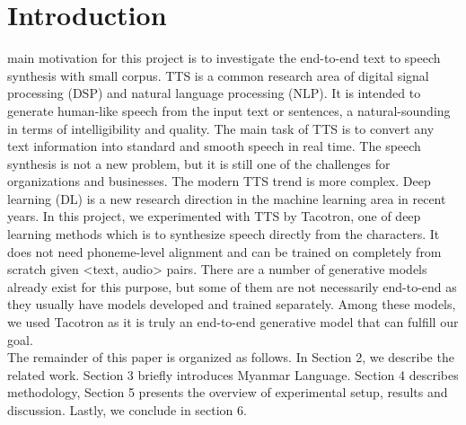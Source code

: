 \documentclass[journal,transmag]{JIISTjrnl}
\begin{document}
\maketitle





%



\section{Introduction}
% 
% 
% 
% 
 main motivation for this project is to investigate the end-to-end text to speech synthesis with small corpus. TTS is a common research area of digital signal processing (DSP) and natural language processing (NLP). It is intended to generate human-like speech from the input text or sentences, a natural-sounding in terms of intelligibility and quality. The main task of TTS is to convert any text information into standard and smooth speech in real time. The speech synthesis is not a new problem, but it is still one of the challenges for organizations and businesses. The modern TTS trend is more complex.  Deep learning (DL) is a new research direction in the machine learning area in recent years. In this project, we experimented with TTS by Tacotron, one of deep learning methods which is to synthesize speech directly from the characters. It does not need phoneme-level alignment and can be trained on completely from scratch given <text, audio> pairs. There are a number of generative models already exist for this purpose, but some of them are not necessarily end-to-end as they usually have models developed and trained separately. Among these models, we used Tacotron as it is truly an end-to-end generative model that can fulfill our goal.\\
	The remainder of this paper is organized as follows. In Section 2, we describe the related work. Section 3 briefly introduces Myanmar Language. Section 4 describes methodology, Section 5 presents the overview of experimental setup, results and discussion. Lastly, we conclude in section 6.
\end{document}
